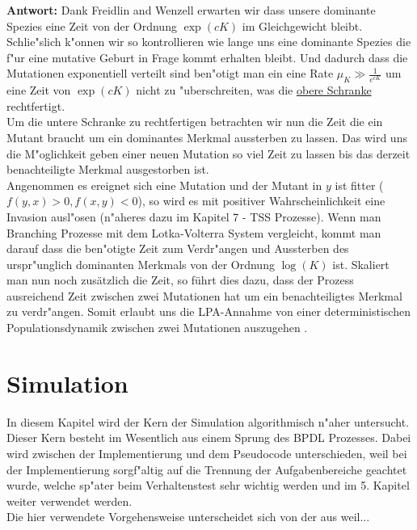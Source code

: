 \documentclass[11pt, a4paper, german]{article}
\theoremstyle{plain}
\begin{document}
	\textbf{Antwort:} Dank Freidlin and Wenzell \cite{freidlin2012random} erwarten wir dass unsere dominante Spezies eine Zeit von der Ordnung $ \exp(cK) $ im Gleichgewicht bleibt. Schlie"slich k"onnen wir so kontrollieren wie lange uns eine dominante Spezies die f"ur eine mutative Geburt in Frage kommt erhalten bleibt. Und dadurch dass die Mutationen exponentiell verteilt sind ben"otigt man ein eine Rate $ \mu_K \gg \frac{1}{e^{cK}} $ um eine Zeit von $ \exp(cK) $ nicht zu "uberschreiten, was die \underline{obere Schranke} rechtfertigt.\\
	Um die untere Schranke zu rechtfertigen betrachten wir nun die Zeit die ein Mutant braucht um ein dominantes Merkmal aussterben zu lassen. Das wird uns die M"oglichkeit geben einer neuen Mutation so viel Zeit zu lassen bis das derzeit benachteiligte Merkmal ausgestorben ist.\\
	Angenommen es ereignet sich eine Mutation und der Mutant in $ y $ ist fitter ($ f(y,x) > 0, f(x,y) < 0 $), so wird es mit positiver Wahrscheinlichkeit eine Invasion ausl"osen (n"aheres dazu im Kapitel 7 - TSS Prozesse). Wenn man Branching Prozesse mit dem Lotka-Volterra System vergleicht, kommt man darauf dass die ben"otigte Zeit zum Verdr"angen und Aussterben des urspr"unglich dominanten Merkmals von der Ordnung $ \log(K) $ ist.
%	
	Skaliert man nun noch zusätzlich die Zeit, so führt dies dazu, dass der Prozess ausreichend Zeit zwischen zwei Mutationen hat um ein benachteiligtes Merkmal zu verdr"angen.
	Somit erlaubt uns die LPA-Annahme von einer deterministischen Populationsdynamik zwischen zwei Mutationen auszugehen \cite{raey}.\\
	

\clearpage
\section{Simulation}
In diesem Kapitel wird der Kern der Simulation algorithmisch n"aher untersucht. Dieser Kern besteht im Wesentlich aus einem Sprung des BPDL Prozesses.
Dabei wird zwischen der Implementierung und dem Pseudocode unterschieden, weil bei der Implementierung sorgf"altig auf die Trennung der Aufgabenbereiche geachtet wurde, welche sp"ater beim Verhaltenstest sehr wichtig werden und im 5. Kapitel weiter verwendet werden.\\
Die hier verwendete Vorgehensweise unterscheidet sich von der aus \cite{fournier2004microscopic} weil...
\end{document}
